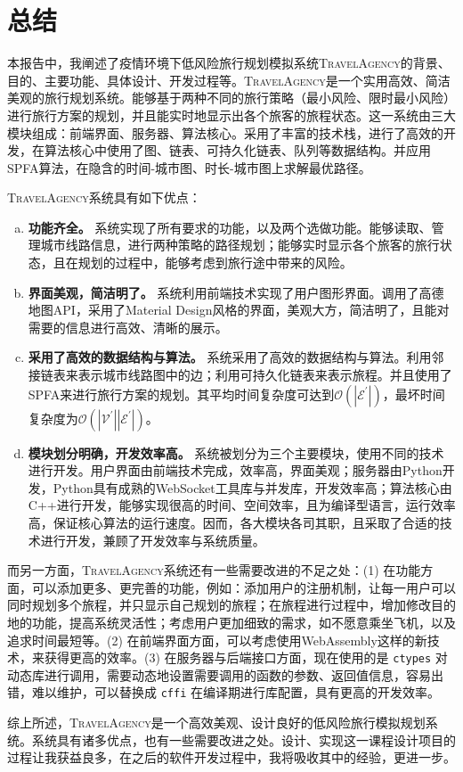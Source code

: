 \section{总结}
\label{sec:conclusion}

本报告中，我阐述了疫情环境下低风险旅行规划模拟系统\textsc{TravelAgency}的背景、目的、主要功能、具体设计、开发过程等。\textsc{TravelAgency}是一个实用高效、简洁美观的旅行规划系统。能够基于两种不同的旅行策略（最小风险、限时最小风险）进行旅行方案的规划，并且能实时地显示出各个旅客的旅程状态。这一系统由三大模块组成：前端界面、服务器、算法核心。采用了丰富的技术栈，进行了高效的开发，在算法核心中使用了图、链表、可持久化链表、队列等数据结构。并应用SPFA算法，在隐含的时间-城市图、时长-城市图上求解最优路径。

\textsc{TravelAgency}系统具有如下优点：
\begin{enumerate}[(a)]
  \item \textbf{功能齐全。} 系统实现了所有要求的功能，以及两个选做功能。能够读取、管理城市线路信息，进行两种策略的路径规划；能够实时显示各个旅客的旅行状态，且在规划的过程中，能够考虑到旅行途中带来的风险。
  \item \textbf{界面美观，简洁明了。} 系统利用前端技术实现了用户图形界面。调用了高德地图API，采用了Material Design风格的界面，美观大方，简洁明了，且能对需要的信息进行高效、清晰的展示。
  \item \textbf{采用了高效的数据结构与算法。} 系统采用了高效的数据结构与算法。利用邻接链表来表示城市线路图中的边；利用可持久化链表来表示旅程。并且使用了SPFA来进行旅行方案的规划。其平均时间复杂度可达到$\mathcal O(|\mathcal E^\prime|)$，最坏时间复杂度为$\mathcal O(|\mathcal V^\prime| |\mathcal E^\prime|)$。
  \item \textbf{模块划分明确，开发效率高。} 系统被划分为三个主要模块，使用不同的技术进行开发。用户界面由前端技术完成，效率高，界面美观；服务器由Python开发，Python具有成熟的WebSocket工具库与并发库，开发效率高；算法核心由C++进行开发，能够实现很高的时间、空间效率，且为编译型语言，运行效率高，保证核心算法的运行速度。因而，各大模块各司其职，且采取了合适的技术进行开发，兼顾了开发效率与系统质量。
\end{enumerate}

而另一方面，\textsc{TravelAgency}系统还有一些需要改进的不足之处：(1) 在功能方面，可以添加更多、更完善的功能，例如：添加用户的注册机制，让每一用户可以同时规划多个旅程，并只显示自己规划的旅程；在旅程进行过程中，增加修改目的地的功能，提高系统灵活性；考虑用户更加细致的需求，如不愿意乘坐飞机，以及追求时间最短等。(2) 在前端界面方面，可以考虑使用WebAssembly这样的新技术，来获得更高的效率。(3) 在服务器与后端接口方面，现在使用的是 \lstinline{ctypes} 对动态库进行调用，需要动态地设置需要调用的函数的参数、返回值信息，容易出错，难以维护，可以替换成 \lstinline{cffi} 在编译期进行库配置，具有更高的开发效率。

综上所述，\textsc{TravelAgency}是一个高效美观、设计良好的低风险旅行模拟规划系统。系统具有诸多优点，也有一些需要改进之处。设计、实现这一课程设计项目的过程让我获益良多，在之后的软件开发过程中，我将吸收其中的经验，更进一步。
